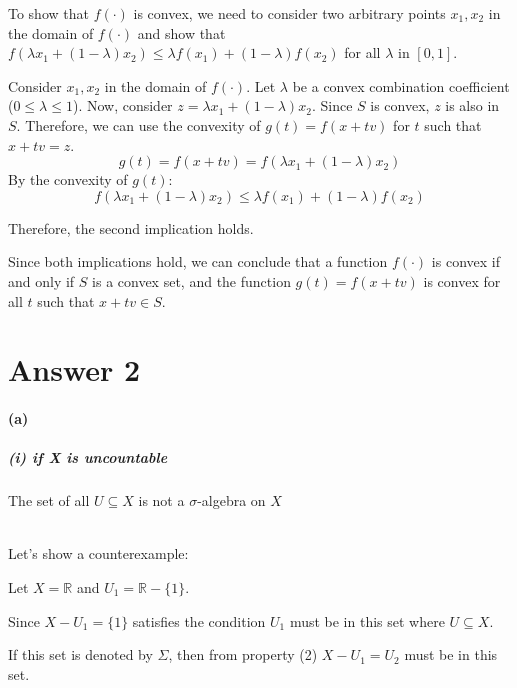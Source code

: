 \documentclass[12pt]{article}
\begin{document}
To show that \( f(·) \) is convex, we need to consider two arbitrary points \( x_1, x_2 \) in the domain of \( f(·) \) and show that \( f(\lambda x_1 + (1 - \lambda) x_2) \leq \lambda f(x_1) + (1 - \lambda) f(x_2) \) for all \( \lambda \) in \([0, 1]\).

Consider \( x_1, x_2 \) in the domain of \( f(·) \). Let \( \lambda \) be a convex combination coefficient (\( 0 \leq \lambda \leq 1 \)). Now, consider \( z = \lambda x_1 + (1 - \lambda) x_2 \). Since \( S \) is convex, \( z \) is also in \( S \). Therefore, we can use the convexity of \( g(t) = f(x + tv) \) for \( t \) such that \( x + tv = z \).
\[ g(t) = f(x + tv) = f(\lambda x_1 + (1 - \lambda) x_2) \]
By the convexity of \( g(t) \):
\[ f(\lambda x_1 + (1 - \lambda) x_2) \leq \lambda f(x_1) + (1 - \lambda) f(x_2) \]

Therefore, the second implication holds.

Since both implications hold, we can conclude that a function \( f(·) \) is convex if and only if \( S \) is a convex set, and the function \( g(t) = f(x + tv) \) is convex for all \( t \) such that \( x + tv \in S \).


\section*{Answer 2}
\paragraph{(a)}
\subparagraph{(i) if X is uncountable} 
The set of all \( U \subseteq X \) is not a \(\sigma\)-algebra on \(X\) \\ \\
\par \hspace*{1em}Let's show a counterexample: \\
\par \hspace*{1em}Let \( X = \mathbb{R} \) and \( U_1 = \mathbb{R} - \{1\} \). \\
\par \hspace*{1em}Since \( X - U_1 = \{1\} \) satisfies the condition \( U_1 \) must be in this set where \( U \subseteq X \).\\
\par \hspace*{1em}If this set is denoted by \( \Sigma \), then from property (2) \( X - U_1 = U_2 \) must be in this set.\\
\end{document}
